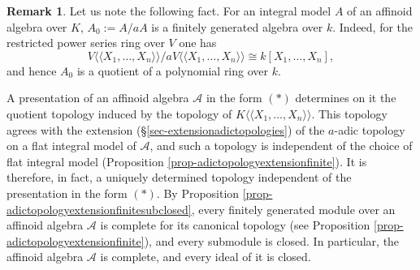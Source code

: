 \documentclass[a4paper,12pt, dvipdfmx]{jsbook}
\def\dl{\langle\!\langle}
\def\dr{\rangle\!\rangle}
\theoremstyle{plain}
\theoremstyle{definition}
\newtheorem{rem}[thm]{\bfseries Remark}
\begin{document}
\begin{rem}\label{rem-reductionfinitetype}{\rm 
Let us note the following fact.
For an integral model $A$ of an affinoid algebra over $K$, $A_0:=A/aA$ is a finitely generated algebra over $k$.
Indeed, for the restricted power series ring over $V$ one has
$$
V\dl X_1,\ldots,X_n\dr/aV\dl X_1,\ldots,X_n\dr\cong k[X_1,\ldots,X_n],
$$
and hence $A_0$ is a quotient of a polynomial ring over $k$.}
\end{rem}

A presentation of an affinoid algebra $\mathcal{A}$ in the form $(\ast)$ determines on it the quotient topology induced by the topology of $K\dl X_1,\ldots,X_n\dr$.
This topology agrees with the extension (\S\ref{sec-extensionadictopologies}) of the $a$-adic topology on a flat integral model of $\mathcal{A}$, and such a topology is independent of the choice of flat integral model (Proposition \ref{prop-adictopologyextensionfinite}). It is therefore, in fact, a uniquely determined topology independent of the presentation in the form $(\ast)$.
By Proposition \ref{prop-adictopologyextensionfinitesubclosed}, every finitely generated module over an affinoid algebra $\mathcal{A}$ is complete for its canonical topology (see Proposition \ref{prop-adictopologyextensionfinite}), and every submodule is closed.
In particular, the affinoid algebra $\mathcal{A}$ is complete, and every ideal of it is closed.
\end{document}
